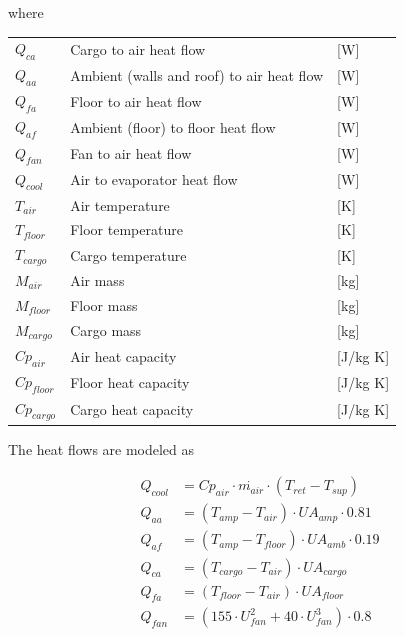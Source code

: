 where
\begin{center}
	\begin{tabular}{l p{8cm} l}
		$Q_{ca}$			& Cargo to air heat flow					& [\si{W}] \\		
		$Q_{aa}$			& Ambient (walls and roof) to air heat flow		& [\si{W}] \\		
		$Q_{fa}$			& Floor to air heat flow 						& [\si{W}] \\		
		$Q_{af}$			& Ambient (floor) to floor heat flow 	& [\si{W}] \\		
		$Q_{fan}$			& Fan to air heat flow 						& [\si{W}] \\		
		$Q_{cool}$			& Air to evaporator heat flow  			& [\si{W}] \\		
		$T_{air}$			& Air temperature 								& [\si{K}] \\
		$T_{floor}$			& Floor temperature						& [\si{K}] \\
		$T_{cargo}$		& Cargo temperature							& [\si{K}] \\
		$M_{air}$			& Air mass										& [\si{kg}] \\
		$M_{floor}$			& Floor mass								& [\si{kg}] \\
		$M_{cargo}$		& Cargo mass								& [\si{kg}] \\		
		$Cp_{air}$			& Air heat capacity							& [\si{J}/\si{kg} \si{K}] \\
		$Cp_{floor}$	& Floor heat capacity						& [\si{J}/\si{kg} \si{K}] \\
		$Cp_{cargo}$	& Cargo heat capacity					& [\si{J}/\si{kg} \si{K}]
	\end{tabular}
\end{center}

The heat flows are modeled as

\begin{align}
	Q_{cool} & = Cp_{air} \cdot \dot{m_{air}} \cdot (T_{ret} - T_{sup}) \label{eq:box_Qcool}\\
	Q_{aa} & = (T_{amp} - T_{air}) \cdot U A_{amp} \cdot 0.81 \label{eq:box_hf_wall-to-air} \\
	Q_{af} & = (T_{amp} - T_{floor}) \cdot U A_{amb} \cdot 0.19 \label{eq:box_hf_floor-to-air} \\
	Q_{ca} & = (T_{cargo} - T_{air}) \cdot U A_{cargo}\\
	Q_{fa} & = (T_{floor} - T_{air}) \cdot U A_{floor}\\
	Q_{fan} & = (155 \cdot U_{fan}^2 + 40 \cdot U_{fan}^3) \cdot 0.8
\end{align}

